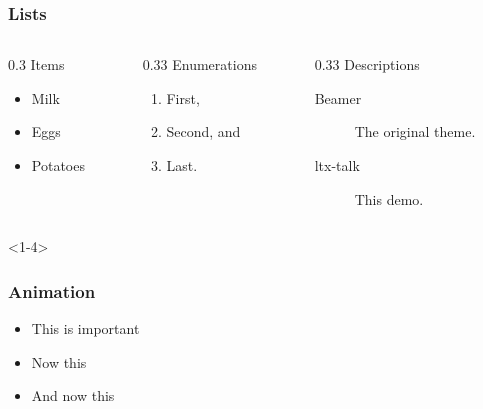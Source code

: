 \documentclass[10pt,aspect-ratio=4:3]{ltx-talk}
\begin{document}
\begin{frame}
  \frametitle{Lists}
  \begin{columns}
    \begin{column}[t]{0.3\textwidth}
      Items
      \begin{itemize}
        \item Milk
        \item Eggs
        \item Potatoes
      \end{itemize}
    \end{column}

    \begin{column}[t]{0.33\textwidth}
      Enumerations
      \begin{enumerate}
        \item First,
        \item Second, and
        \item Last.
      \end{enumerate}
    \end{column}

    \begin{column}[t]{0.33\textwidth}
      Descriptions
      \begin{description}
        \item[Beamer] The original theme.
        \item[ltx-talk] This demo.
      \end{description}
    \end{column}
  \end{columns}
\end{frame}

\begin{frame}<1-4>
  \frametitle{Animation}
  \begin{itemize}
    \item<1-> \alert<4>{This is important}
    \item<2-> Now this
    \item<3-> And now this
  \end{itemize}
\end{frame}
\end{document}
